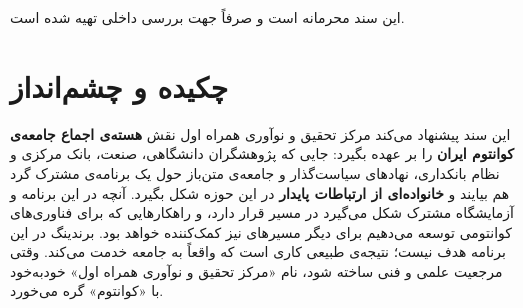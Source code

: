 \documentclass[a4paper,12pt]{article}
\begin{document}
\begin{titlepage}
		\begin{center}
		\end{center}
		
		\vfill
		
		{\small\color{mci-gray}\centering این سند محرمانه است و صرفاً جهت بررسی داخلی تهیه شده است.}
		
	\end{titlepage}

	\tableofcontents
	\newpage

	\section*{چکیده و چشم‌انداز}

	این سند پیشنهاد می‌کند مرکز تحقیق و نوآوری همراه اول نقش
	\textbf{هسته‌ی اجماع جامعه‌ی کوانتوم ایران} را بر عهده بگیرد: جایی که پژوهشگران دانشگاهی،
	صنعت، بانک مرکزی و نظام بانکداری، نهادهای سیاست‌گذار و جامعه‌ی متن‌باز حول یک برنامه‌ی مشترک گرد هم بیایند و
	\textbf{خانواده‌ای از ارتباطات پایدار} در این حوزه شکل بگیرد.
	آنچه در این برنامه و آزمایشگاه مشترک شکل می‌گیرد در مسیر  قرار دارد، و راهکارهایی که برای فناوری‌های کوانتومی توسعه می‌دهیم برای دیگر مسیرهای  نیز کمک‌کننده خواهد بود.
	برندینگ در این برنامه هدف نیست؛ نتیجه‌ی طبیعی کاری است که واقعاً به جامعه خدمت می‌کند.
	وقتی مرجعیت علمی و فنی ساخته شود، نام «مرکز تحقیق و نوآوری همراه اول» خودبه‌خود با «کوانتوم» گره می‌خورد.
\end{document}
